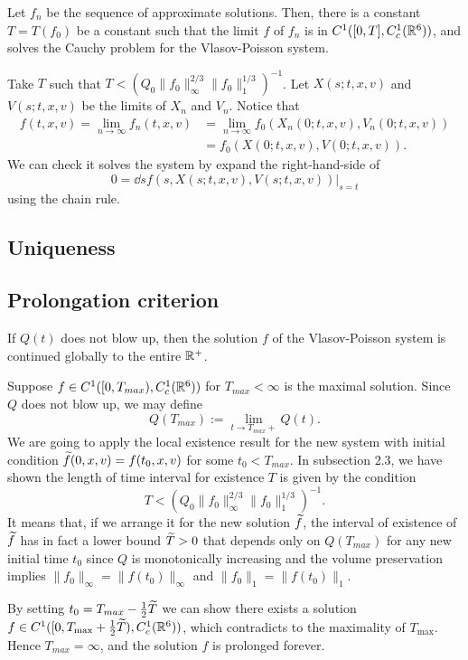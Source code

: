 \documentclass[11pt]{amsart}
\begin{document}
\begin{prop}
Let $f_n$ be the sequence of approximate solutions.
Then, there is a constant $T=T(f_0)$ be a constant such that the limit $f$ of $f_n$ is in $C^1([0,T],C_c^1(\mathbb{R}^6))$, and solves the Cauchy problem for the Vlasov-Poisson system.
\end{prop}
\begin{pf}
Take $T$ such that $T<(Q_0\|f_0\|_\infty^{2/3}\|f_0\|_1^{1/3})^{-1}$.
Let $X(s;t,x,v)$ and $V(s;t,x,v)$ be the limits of $X_n$ and $V_n$.
Notice that
\begin{align*}
f(t,x,v)=\lim_{n\to\infty}f_n(t,x,v)&=\lim_{n\to\infty}f_0(X_n(0;t,x,v),V_n(0;t,x,v))\\
&=f_0(X(0;t,x,v),V(0;t,x,v)).
\end{align*}
We can check it solves the system by expand the right-hand-side of
\[0=\dd{s}f(s,X(s;t,x,v),V(s;t,x,v))|_{s=t}\]
using the chain rule.
\end{pf}


\subsection{Uniqueness}



\subsection{Prolongation criterion}

\begin{prop}
If $Q(t)$ does not blow up, then the solution $f$ of the Vlasov-Poisson system is continued globally to the entire $\mathbb{R}^+$.
\end{prop}
\begin{pf}
Suppose $f\in C^1([0,T_{max}),C_c^1(\mathbb{R}^6))$ for $T_{max}<\infty$ is the maximal solution.
Since $Q$ does not blow up, we may define
\[Q(T_{max}):=\lim_{t\to T_{max}+}Q(t).\]
We are going to apply the local existence result for the new system with initial condition $\widetilde f(0,x,v)=f(t_0,x,v)$ for some $t_0<T_{max}$.
In subsection 2.3, we have shown the length of time interval for existence $T$ is given by the condition
\[T<(Q_0\|f_0\|_\infty^{2/3}\|f_0\|_1^{1/3})^{-1}.\]
It means that, if we arrange it for the new solution $\widetilde f$, the interval of existence of $\widetilde f$ has in fact a lower bound $\widetilde T>0$ that depends only on $Q(T_{max})$ for any new initial time $t_0$ since $Q$ is monotonically increasing and the volume preservation implies $\|f_0\|_\infty=\|f(t_0)\|_\infty$ and $\|f_0\|_1=\|f(t_0)\|_1$.

By setting $t_0=T_{max}-\frac12\widetilde T$ we can show there exists a solution $f\in C^1([0,T_{\max}+\frac12\widetilde T),C_c^1(\mathbb{R}^6))$, which contradicts to the maximality of $T_{\max}$.
Hence $T_{max}=\infty$, and the solution $f$ is prolonged forever.
\end{pf}
\end{document}
